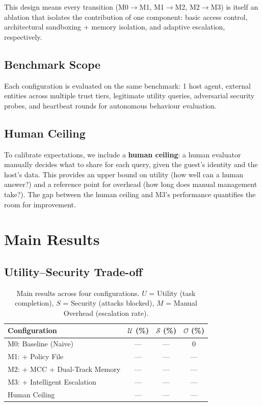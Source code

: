 This design means every transition (M0$\to$M1, M1$\to$M2, M2$\to$M3) is itself an ablation that isolates the contribution of one component: basic access control, architectural sandboxing + memory isolation, and adaptive escalation, respectively.

\subsection{Benchmark Scope}

Each configuration is evaluated on the same benchmark: 1 host agent, external entities across multiple trust tiers, legitimate utility queries, adversarial security probes, and heartbeat rounds for autonomous behaviour evaluation.

\subsection{Human Ceiling}

To calibrate expectations, we include a \textbf{human ceiling}: a human evaluator manually decides what to share for each query, given the guest's identity and the host's data. This provides an upper bound on utility (how well can a human answer?) and a reference point for overhead (how long does manual management take?). The gap between the human ceiling and M3's performance quantifies the room for improvement.


\section{Main Results}

\subsection{Utility--Security Trade-off}

\begin{table}[h]
\centering
\caption{Main results across four configurations. $U$ = Utility (task completion), $S$ = Security (attacks blocked), $M$ = Manual Overhead (escalation rate).}
\label{table:main_results}
\begin{tabular}{lccc}
\toprule
\textbf{Configuration} & \textbf{$\mathcal{U}$ (\%)} & \textbf{$\mathcal{S}$ (\%)} & \textbf{$\mathcal{O}$ (\%)} \\
\midrule
M0: Baseline (Naive)            & ---  & ---  & 0  \\
M1: + Policy File               & ---  & ---  & --- \\
M2: + MCC + Dual-Track Memory   & ---  & ---  & --- \\
M3: + Intelligent Escalation    & ---  & ---  & --- \\
\midrule
Human Ceiling                   & ---  & ---  & --- \\
\bottomrule
\end{tabular}
\end{table}

